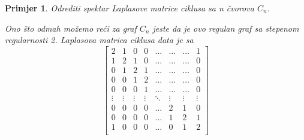 \documentclass[11pt]{article}
\newtheorem{example}{Primjer}
\begin{document}
	\begin{example}
		Odrediti spektar Laplasove matrice ciklusa sa n čvorova $C_n$.
	
		Ono što odmah možemo reći za graf $C_n$ jeste da je ovo regulan graf sa stepenom regularnosti 2. 
	Laplasova matrica ciklusa data je sa 
	\[
	\begin{bmatrix}
	
	2 & 1 & 0 & 0 & \dots & \dots & \dots & 1 \\
	1 & 2 & 1 & 0 & \dots & \dots & \dots & 0 \\
	0 & 1 & 2 & 1 & \dots & \dots & \dots & 0 \\
	0 & 0 & 1 & 2 & \dots & \dots & \dots & 0 \\
	0 & 0 & 0 & 1 & \dots & \dots & \dots & 0 \\
	\vdots  & \vdots  & \vdots  & \vdots  & \ddots & \vdots & \vdots & \vdots  \\
	0 & 0 & 0 & 0 & \dots & 2 & 1 & 0 \\
	0 & 0 & 0 & 0 & \dots & 1 & 2 & 1 \\
	1 & 0 & 0 & 0 & \dots & 0 & 1 & 2 \\
	\end{bmatrix}
	\]
	

\end{example}
\end{document}
